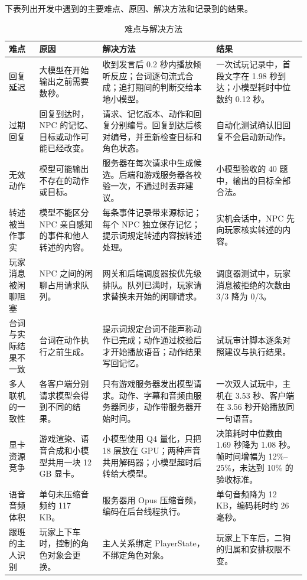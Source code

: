 \documentclass[11pt]{article}
\begin{document}
\need{18cm}

下表列出开发中遇到的主要难点、原因、解决方法和记录到的结果。

\begin{table}[H]
\small
\begin{tabularx}{\textwidth}{@{}>{\raggedright\arraybackslash}p{2.3cm} >{\raggedright\arraybackslash}p{3.3cm} L >{\raggedright\arraybackslash}p{4.0cm}@{}}
\toprule
\textbf{难点} & \textbf{原因} & \textbf{解决方法} & \textbf{结果} \\
\midrule
回复延迟 & 大模型在开始输出之前需要数秒。 & 收到发言后 0.2 秒内播放倾听反应；台词逐句流式合成；追打期间的判断交给本地小模型。 & 一次试玩记录中，首段文字在 1.98 秒到达；小模型耗时中位数约 0.12 秒。 \\
过期回复 & 回复到达时，NPC 的记忆、目标或动作可能已经改变。 & 请求、记忆版本、动作和回复分别编号。回复到达后核对编号，并重新检查目标和角色状态。 & 自动化测试确认旧回复不会启动新动作。 \\
无效动作 & 模型可能输出不存在的动作或目标。 & 服务器在每次请求中生成候选。后端和游戏服务器各校验一次，不通过时丢弃建议。 & 小模型验收的 40 题中，输出的目标全部合法。 \\
转述被当作事实 & 模型不能区分 NPC 亲自感知的事件和他人转述的内容。 & 每条事件记录带来源标记；每个 NPC 独立保存记忆；提示词规定转述内容按转述处理。 & 实机会话中，NPC 先向玩家核实转述的内容。 \\
玩家消息被闲聊阻塞 & NPC 之间的闲聊占用请求队列。 & 网关和后端调度器按优先级排队。队列已满时，玩家请求替换未开始的闲聊请求。 & 调度器测试中，玩家消息被拒绝的次数由 3/3 降为 0/3。 \\
台词与实际结果不一致 & 台词在动作执行之前生成。 & 提示词规定台词不能声称动作已完成；动作通过校验后才开始播放语音；动作结果写回记忆。 & 试玩审计脚本逐条对照建议与执行结果。 \\
多人联机的一致性 & 各客户端分别请求模型会得到不同的结果。 & 只有游戏服务器发出模型请求。动作、字幕和音频由服务器同步，动作带服务器开始时间。 & 一次双人试玩中，主机在 3.53 秒、客户端在 3.56 秒开始播放同一句语音。 \\
显卡资源竞争 & 游戏渲染、语音合成和小模型共用一块 12 GB 显卡。 & 小模型使用 Q4 量化，只把 18 层放在 GPU；两种声音共用解码器；小模型超时后转给大模型。 & 决策耗时中位数由 1.69 秒降为 1.08 秒。帧时间增幅为 12\%–25\%，未达到 10\% 的验收标准。 \\
语音音频体积 & 单句未压缩音频约 117 KB。 & 服务器用 Opus 压缩音频，编码在后台线程执行。 & 单句音频降为 12 KB，编码耗时约 26 毫秒。 \\
跟班的主人识别 & 玩家上下车时，控制的角色对象会更换。 & 主人关系绑定 PlayerState，不绑定角色对象。 & 玩家上下车后，二狗的归属和安排权限不变。 \\
\bottomrule
\end{tabularx}
\caption{难点与解决方法}
\end{table}
\end{document}
